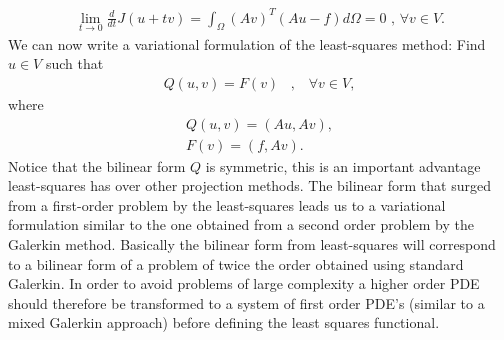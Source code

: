 \begin{align}
	\lim_{t\rightarrow 0} \frac{d}{dt}J(u+tv) = \int_{\Omega}(Av)^T(Au-f)d\Omega = 0 \text{    ,   } \forall v \in V.
	\label{eq:minProb}
\end{align}
We can now write a variational formulation of the least-squares method: Find $u \in V$ such that 
\begin{align}
	Q(u,v) = F(v) \; \; \; , \; \; \; \forall v \in V,
	\label{def:varForm}
\end{align}
where
\begin{align}
	Q(u,v) = (Au,Av), \\
	F(v) = (f,Av).
	\label{def:bilin}
\end{align}
Notice that the bilinear form $Q$ is symmetric, this is an important advantage least-squares has over other projection methods. The bilinear form that surged from a first-order problem by the least-squares leads us to a variational formulation similar to the one obtained from a second order problem by the Galerkin method. Basically the bilinear form from least-squares will correspond to a bilinear form of a problem of twice the order obtained using standard Galerkin. In order to avoid problems of large complexity a higher order PDE should therefore be transformed to a system of first order PDE's (similar to a mixed Galerkin approach) before defining the least squares functional.
\cite{Jiang}

